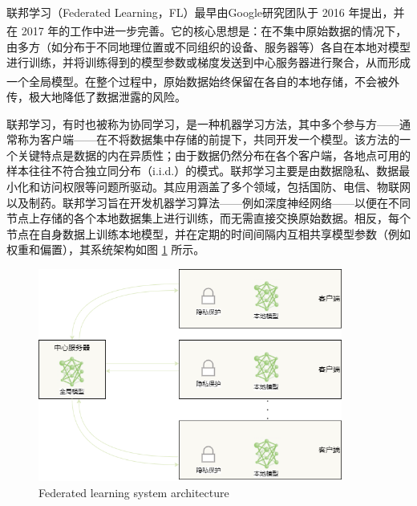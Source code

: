 联邦学习（Federated Learning，FL）最早由Google研究团队于 2016 年提出\textsuperscript{\citep{konevcny2016federated}}，并在 2017 年的工作中进一步完善\textsuperscript{\citep{mcmahan2017communication}}。它的核心思想是：在不集中原始数据的情况下，由多方（如分布于不同地理位置或不同组织的设备、服务器等）各自在本地对模型进行训练，并将训练得到的模型参数或梯度发送到中心服务器进行聚合，从而形成一个全局模型\textsuperscript{\citep{li2020federated}}。在整个过程中，原始数据始终保留在各自的本地存储，不会被外传，极大地降低了数据泄露的风险。

联邦学习，有时也被称为协同学习，是一种机器学习方法，其中多个参与方——通常称为客户端——在不将数据集中存储的前提下，共同开发一个模型\citep{kairouz2021advances}。该方法的一个关键特点是数据的内在异质性；由于数据仍然分布在各个客户端，各地点可用的样本往往不符合独立同分布（i.i.d.）的模式。联邦学习主要是由数据隐私、数据最小化和访问权限等问题所驱动。其应用涵盖了多个领域，包括国防、电信、物联网以及制药。联邦学习旨在开发机器学习算法——例如深度神经网络——以便在不同节点上存储的各个本地数据集上进行训练，而无需直接交换原始数据。相反，每个节点在自身数据上训练本地模型，并在定期的时间间隔内互相共享模型参数（例如权重和偏置），其系统架构如图 \ref{FedArch} 所示。

\begin{figure}[h] %
	\centering %
	\includegraphics[width=10cm]{chapters/imgs/FedArch3} %
	{\wuhao Federated learning system architecture} %
	\label{FedArch} %
\end{figure} %

